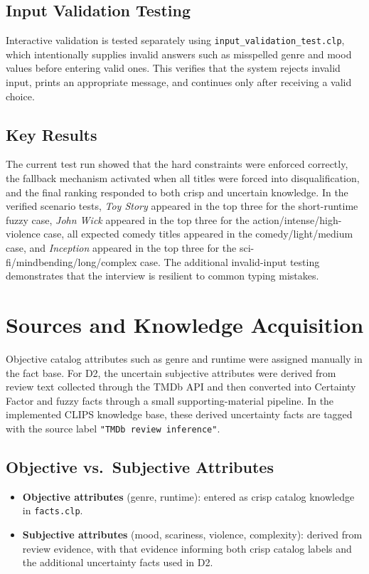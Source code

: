 \documentclass[11pt]{article}
\begin{document}
\subsection{Input Validation Testing}
Interactive validation is tested separately using \texttt{input\_validation\_test.clp}, which intentionally supplies invalid answers such as misspelled genre and mood values before entering valid ones. This verifies that the system rejects invalid input, prints an appropriate message, and continues only after receiving a valid choice.

\subsection{Key Results}
The current test run showed that the hard constraints were enforced correctly, the fallback mechanism activated when all titles were forced into disqualification, and the final ranking responded to both crisp and uncertain knowledge. In the verified scenario tests, \textit{Toy Story} appeared in the top three for the short-runtime fuzzy case, \textit{John Wick} appeared in the top three for the action/intense/high-violence case, all expected comedy titles appeared in the comedy/light/medium case, and \textit{Inception} appeared in the top three for the sci-fi/mindbending/long/complex case. The additional invalid-input testing demonstrates that the interview is resilient to common typing mistakes.

\section{Sources and Knowledge Acquisition}
Objective catalog attributes such as genre and runtime were assigned manually in the fact base. For D2, the uncertain subjective attributes were derived from review text collected through the TMDb API and then converted into Certainty Factor and fuzzy facts through a small supporting-material pipeline. In the implemented CLIPS knowledge base, these derived uncertainty facts are tagged with the source label \texttt{"TMDb review inference"}.

\subsection{Objective vs.\ Subjective Attributes}
\begin{itemize}
  \item \textbf{Objective attributes} (genre, runtime): entered as crisp catalog knowledge in \texttt{facts.clp}.
  \item \textbf{Subjective attributes} (mood, scariness, violence, complexity): derived from review evidence, with that evidence informing both crisp catalog labels and the additional uncertainty facts used in D2.
\end{itemize}
\end{document}
